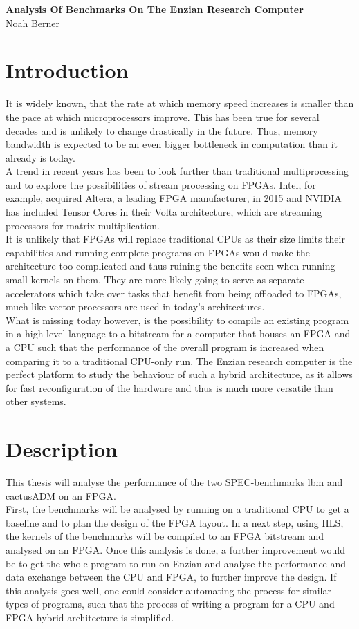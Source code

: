 \documentclass[12pt]{article}
\begin{document}
\begingroup  
  \centering
  \LARGE \textbf{Analysis Of Benchmarks On The Enzian Research Computer}\\
  \large Noah Berner\par
\endgroup

\section*{Introduction}
It is widely known, that the rate at which memory speed increases is smaller than the pace at which microprocessors improve. This has been true for several decades and is unlikely to change drastically in the future. Thus, memory bandwidth is expected to be an even bigger bottleneck in computation than it already is today.\\
A trend in recent years has been to look further than traditional multiprocessing and to explore the possibilities of stream processing on FPGAs. Intel, for example, acquired Altera, a leading FPGA manufacturer, in 2015 and NVIDIA has included Tensor Cores in their Volta architecture, which are streaming processors for matrix multiplication.\\
It is unlikely that FPGAs will replace traditional CPUs as their size limits their capabilities and running complete programs on FPGAs would make the architecture too complicated and thus ruining the benefits seen when running small kernels on them. They are more likely going to serve as separate accelerators which take over tasks that benefit from being offloaded to FPGAs, much like vector processors are used in today's architectures.\\
What is missing today however, is the possibility to compile an existing program in a high level language to a bitstream for a computer that houses an FPGA and a CPU such that the performance of the overall program is increased when comparing it to a traditional CPU-only run. The Enzian research computer \cite{Enzian} is the perfect platform to study the behaviour of such a hybrid architecture, as it allows for fast reconfiguration of the hardware and thus is much more versatile than other systems. 
\section*{Description}
This thesis will analyse the performance of the two SPEC-benchmarks lbm \cite{SPEC_lbm} and cactusADM \cite{SPEC_cactusADM} on an FPGA.\\
First, the benchmarks will be analysed by running on a traditional CPU to get a baseline and to plan the design of the FPGA layout. In a next step, using HLS, the kernels of the benchmarks will be compiled to an FPGA bitstream and analysed on an FPGA. Once this analysis is done, a further improvement would be to get the whole program to run on Enzian and analyse the performance and data exchange between the CPU and FPGA, to further improve the design. If this analysis goes well, one could consider automating the process for similar types of programs, such that the process of writing a program for a CPU and FPGA hybrid architecture is simplified.
\end{document}
